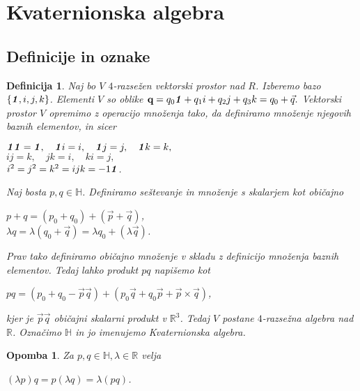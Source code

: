 \documentclass[a4paper,12pt]{article}
\def\R{\mathbb{R}} %
\def\H{\mathbb{H}} %
\def\1{\textbf{\emph{1}}}
\newtheorem{opomba}{Opomba}
\newtheorem{definicija}{Definicija}
\begin{document}
\section{Kvaternionska algebra}
\subsection{Definicije in oznake}

\begin{definicija}
Naj bo $V$ $4$-razsežen vektorski prostor nad $R$. Izberemo bazo $\left\{\1, i, j, k\right\}$. Elementi $V$ so oblike $\textbf{q} = q_{0}\1 + q_{1}i + q_{2}j + q_{3}k = q_{0} + \vec{q}.$
Vektorski prostor $V$ opremimo z operacijo množenja tako, da definiramo množenje njegovih baznih elementov, in sicer
\begin{center}
   $\1 \1 = \1, \hspace{1em}  \1i = i, \hspace{1em} \1j = j, \hspace{1em} \1k = k,$\\
   $ij = k, \hspace{1em} jk = i, \hspace{1em} ki = j,$\\
   $i^2 = j^2 = k^2 = ijk = -1\1$.
\end{center}
Naj bosta $p, q \in \H$. Definiramo seštevanje in množenje s skalarjem kot običajno
\begin{center}
   $p + q = \left( p_{0} + q_{0} \right) + \left( \vec{p} + \vec{q} \right)$, \\
   $ \lambda q = \lambda \left(q_{0} + \vec{q} \right) = \lambda q_{0} + \left(\lambda \vec{q}\right) $.
\end{center}
Prav tako definiramo običajno množenje v skladu z definicijo množenja baznih elementov. Tedaj lahko
produkt $pq$ napišemo kot
\begin{center}
   $pq = (p_{0} + q_{0} - \vec{p} \vec{q}) + (p_{0}\vec{q} + q_{0}\vec{p} + \vec{p}\times\vec{q})$,
\end{center}
kjer je $\vec{p}\vec{q}$ običajni skalarni produkt v $\R^3$.
Tedaj $V$ postane $4$-razsežna algebra nad $\R$. Označimo $\H$ in jo imenujemo \emph{Kvaternionska algebra}.
\end{definicija}

\begin{opomba}
Za $p,q \in \H, \lambda \in \R$ velja
\begin{center}
      $(\lambda p)q = p(\lambda q) = \lambda (pq)$.
\end{center}
\end{opomba}
\end{document}
